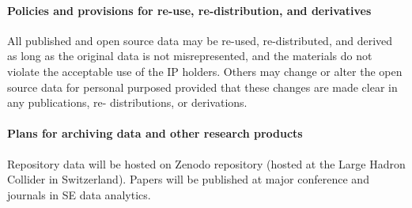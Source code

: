 \paragraph{Policies and provisions for re-use, re-distribution, and derivatives}
All published and open source data may be re-used, re-distributed, and derived as long as the original data is not misrepresented, and the materials do not violate the acceptable use of the IP holders. Others may change or alter the open source data for personal purposed provided that these changes are made clear in any publications, re- distributions, or derivations. 
\vspace{8pt}

\paragraph{Plans for archiving data and other research products}
Repository data will be hosted on Zenodo repository (hosted at the Large Hadron Collider in Switzerland). Papers will be published at major conference and journals in SE data analytics.
